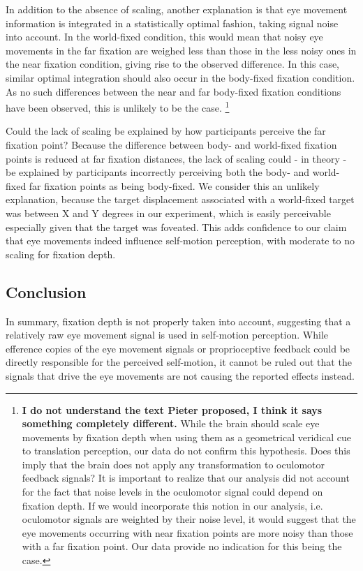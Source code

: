 In addition to the absence of scaling, another explanation is that eye movement information is integrated in a statistically optimal fashion, taking signal noise into account. In the world-fixed condition, this would mean that noisy eye movements in the far fixation are weighed less than those in the less noisy ones in the near fixation condition, giving rise to the observed difference. In this case, similar optimal integration should also occur in the body-fixed fixation condition. As no such differences between the near and far body-fixed fixation conditions have been observed, this is unlikely to be the case. \footnote{\textbf{I do not understand the text Pieter proposed, I think it says something completely different.} While the brain should scale eye movements by fixation depth when using them as a geometrical veridical cue to translation perception, our data do not confirm this hypothesis. Does this imply that the brain does not apply any transformation to oculomotor feedback signals? It is important to realize that our analysis did not account for the fact that noise levels in the oculomotor signal could depend on fixation depth. If we would incorporate this notion in our analysis, i.e.  oculomotor signals are weighted by their noise level, it would suggest that the eye movements occurring with near fixation points are more noisy than those with a far fixation point. Our data provide no indication for this being the case. }

Could the lack of scaling be explained by how participants perceive the far fixation point? Because the difference between body- and world-fixed fixation points is reduced at far fixation distances, the lack of scaling could - in theory - be explained by participants incorrectly perceiving both the body- and world-fixed far fixation points as being body-fixed. We consider this an unlikely explanation, because the target displacement associated with a world-fixed target was between X and Y degrees in our experiment, which is easily perceivable especially given that the target was foveated. This adds confidence to our claim that eye movements indeed influence self-motion perception, with moderate to no scaling for fixation depth.

\subsection{Conclusion}
In summary, fixation depth is not properly taken into account, suggesting that a relatively raw eye movement signal is used in self-motion perception. While efference copies of the eye movement signals or proprioceptive feedback could be directly responsible for the perceived self-motion, it cannot be ruled out that the signals that drive the eye movements are not causing the reported effects instead.
